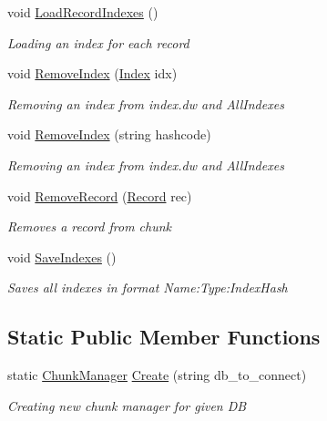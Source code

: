 \begin{DoxyCompactItemize}
\item 
void \hyperlink{class_dwarf_d_b_1_1_chunk_manager_1_1_chunk_manager_a80aab988ea4c69f7abcfcd2015623a9c}{Load\+Record\+Indexes} ()
\begin{DoxyCompactList}\small\item\em Loading an index for each record \end{DoxyCompactList}\item 
void \hyperlink{class_dwarf_d_b_1_1_chunk_manager_1_1_chunk_manager_a66cad77309d9d5a6d10a364f2e705b47}{Remove\+Index} (\hyperlink{class_dwarf_d_b_1_1_data_structures_1_1_index}{Index} idx)
\begin{DoxyCompactList}\small\item\em Removing an index from index.\+dw and All\+Indexes \end{DoxyCompactList}\item 
void \hyperlink{class_dwarf_d_b_1_1_chunk_manager_1_1_chunk_manager_a73b94219d8eb3eae9eb06029d15abcaf}{Remove\+Index} (string hashcode)
\begin{DoxyCompactList}\small\item\em Removing an index from index.\+dw and All\+Indexes \end{DoxyCompactList}\item 
void \hyperlink{class_dwarf_d_b_1_1_chunk_manager_1_1_chunk_manager_ae75710040c6048aebd07ec5161945386}{Remove\+Record} (\hyperlink{class_dwarf_d_b_1_1_data_structures_1_1_record}{Record} rec)
\begin{DoxyCompactList}\small\item\em Removes a record from chunk \end{DoxyCompactList}\item 
void \hyperlink{class_dwarf_d_b_1_1_chunk_manager_1_1_chunk_manager_af8099b5fa9a87264defdb4687e9851b0}{Save\+Indexes} ()
\begin{DoxyCompactList}\small\item\em Saves all indexes in format Name\+:\+Type\+:Index\+Hash \end{DoxyCompactList}\end{DoxyCompactItemize}
\subsection*{Static Public Member Functions}
\begin{DoxyCompactItemize}
\item 
static \hyperlink{class_dwarf_d_b_1_1_chunk_manager_1_1_chunk_manager}{Chunk\+Manager} \hyperlink{class_dwarf_d_b_1_1_chunk_manager_1_1_chunk_manager_ac75fd758d8a6f1579eb15ac3f398c1ea}{Create} (string db\+\_\+to\+\_\+connect)
\begin{DoxyCompactList}\small\item\em Creating new chunk manager for given D\+B \end{DoxyCompactList}\end{DoxyCompactItemize}
